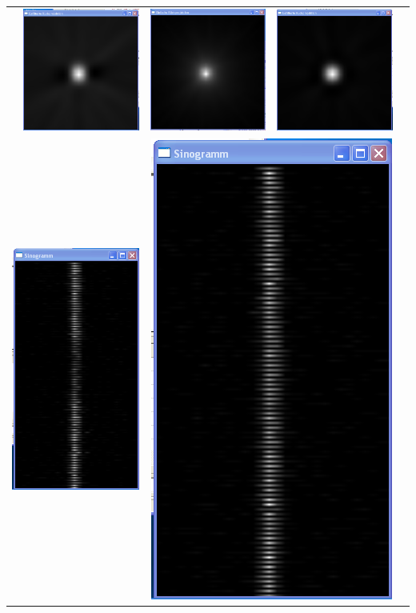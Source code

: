 \begin{longtable}{p{3cm}p{3cm}p{3cm}p{3cm}c}
                  & 
                  \includegraphics[width=.2\textwidth, height=0.125\textheight]{pic/Einzelfenster_Bilder/inhomogene_Messung/inhomo5gef_prj.png}
                  &
                  \includegraphics[width=.2\textwidth, height=0.125\textheight]{pic/Einzelfenster_Bilder/isotrope_Messung/iso6einf_prj.png}
                  & 
                  \includegraphics[width=.2\textwidth, height=0.125\textheight]{pic/Einzelfenster_Bilder/isotrope_Messung/iso6gef_prj.png}\\
                  \multicolumn{2}{c}{\includegraphics[width=.2\textwidth, height=0.25\textheight]{pic/Einzelfenster_Bilder/inhomogene_Messung/inhomo5sino.png}}
                  &
                  \multicolumn{2}{c}{\includegraphics[width=.2\textwidth, height=0.25\textheight]{pic/Einzelfenster_Bilder/isotrope_Messung/iso6sino.png}}
           \end{longtable}
